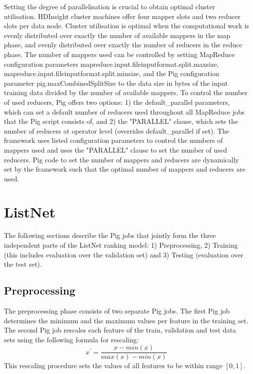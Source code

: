 Setting the degree of parallelisation is crucial to obtain optimal cluster utilisation. HDInsight cluster machines offer four mapper slots and two reducer slots per data node. Cluster utilisation is optimal when the computational work is evenly distributed over exactly the number of available mappers in the map phase, and evenly distributed over exactly the number of reducers in the reduce phase. The number of mappers used can be controlled by setting MapReduce configuration parameters mapreduce.input.fileinputformat.split.maxsize, mapreduce.input.fileinputformat.split.minsize, and the Pig configuration parameter pig.maxCombinedSplitSize to the data size in bytes of the input training data divided by the number of available mappers. To control the number of used reducers, Pig offers two options: 1) the default\_parallel parameters, which can set a default number of reducers used throughout all MapReduce jobs that the Pig script consists of, and 2) the "PARALLEL" clause, which sets the number of reducers at operator level (overrides default\_parallel if set). The framework uses listed configuration parameters to control the numbers of mappers used and uses the "PARALLEL" clause to set the number of used reducers. Pig code to set the number of mappers and reducers are dynamically set by the framework such that the optimal number of mappers and reducers are used.

\section{ListNet}
The following sections describe the Pig jobs that jointly form the three independent parts of the ListNet ranking model: 1) Preprocessing, 2) Training (this includes evaluation over the validation set) and 3) Testing (evaluation over the test set). 
\subsection{Preprocessing}
The preprocessing phase consists of two separate Pig jobs. The first Pig job determines the minimum and the maximum values per feature in the training set. The second Pig job rescales each feature of the train, validation and test data sets using the following formula for rescaling:
\begin{equation}
x^{'} = \frac{x-min(x)}{max(x)-min(x)}
\label{eq:rescaling}
\end{equation}
This rescaling procedure sets the values of all features to be within range $[0,1]$.\\

